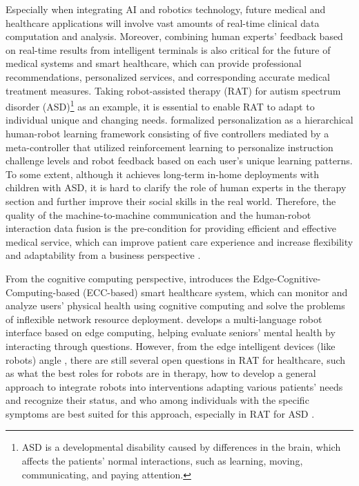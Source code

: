 \documentclass[letterpaper]{article} %
\begin{document}
Especially when integrating AI and robotics technology, future medical and healthcare applications will involve vast amounts of real-time clinical data computation and analysis. Moreover, combining human experts' feedback based on real-time results from intelligent terminals is also critical for the future of medical systems and smart healthcare, which can provide professional recommendations, personalized services, and corresponding accurate medical treatment measures. Taking robot-assisted therapy (RAT) for autism spectrum disorder (ASD)\footnote{ASD is a developmental disability caused by differences in the brain, which affects the patients' normal interactions, such as learning, moving, communicating, and paying attention.} as an example, it is essential to enable RAT to adapt to individual unique and changing needs.
\cite{clabaugh2019long} formalized personalization as a hierarchical human-robot learning framework consisting of five controllers mediated by a meta-controller that utilized reinforcement learning to personalize instruction challenge levels and robot feedback based on each user’s unique learning patterns. To some extent, although it achieves long-term in-home deployments with children with ASD, it is hard to clarify the role of human experts in the therapy section and further improve their social skills in the real world. 
Therefore, the quality of the machine-to-machine communication and the human-robot interaction data fusion is the pre-condition for providing efficient and effective medical service, which can improve patient care experience and increase flexibility and adaptability from a business perspective \cite{wan2020cognitive}. 

From the cognitive computing perspective, \cite{chen2018edge} introduces the Edge-Cognitive-Computing-based (ECC-based) smart healthcare system, which can monitor and analyze users' physical health using cognitive computing and solve the problems of inflexible network resource deployment. \cite{yvanoff2020edge} develops a multi-language robot interface based on edge computing, helping evaluate seniors' mental health by interacting through questions. However, from the edge intelligent devices (like robots) angle \cite{groshev2023edge}, there are still several open questions in RAT for healthcare, such as what the best roles for robots are in therapy, how to develop a general approach to integrate robots into interventions adapting various patients' needs and recognize their status, and who among individuals with the specific symptoms are best suited for this approach, especially in RAT for ASD \cite{diehl2012clinical}. 
\end{document}

